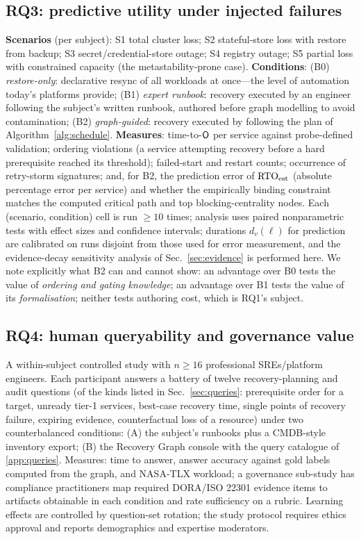 \subsection{RQ3: predictive utility under injected failures}
\label{sec:rq3}
\textbf{Scenarios} (per subject): S1 total cluster loss; S2 stateful-store loss with restore from backup; S3 secret/credential-store outage; S4 registry outage; S5 partial loss with constrained capacity (the metastability-prone case). \textbf{Conditions}: (B0) \emph{restore-only}: declarative resync of all workloads at once---the level of automation today's platforms provide; (B1) \emph{expert runbook}: recovery executed by an engineer following the subject's written runbook, authored before graph modelling to avoid contamination; (B2) \emph{graph-guided}: recovery executed by following the plan of Algorithm~\ref{alg:schedule}. \textbf{Measures}: time-to-$\mathsf{O}$ per service against probe-defined validation; ordering violations (a service attempting recovery before a hard prerequisite reached its threshold); failed-start and restart counts; occurrence of retry-storm signatures; and, for B2, the prediction error of $\mathrm{RTO}_{\mathrm{est}}$ (absolute percentage error per service) and whether the empirically binding constraint matches the computed critical path and top blocking-centrality nodes. Each (scenario, condition) cell is run $\geq 10$ times; analysis uses paired nonparametric tests with effect sizes and confidence intervals; durations $d_v(\ell)$ for prediction are calibrated on runs disjoint from those used for error measurement, and the evidence-decay sensitivity analysis of Sec.~\ref{sec:evidence} is performed here. We note explicitly what B2 can and cannot show: an advantage over B0 tests the value of \emph{ordering and gating knowledge}; an advantage over B1 tests the value of its \emph{formalisation}; neither tests authoring cost, which is RQ1's subject.

\subsection{RQ4: human queryability and governance value}
\label{sec:rq4}
A within-subject controlled study with $n \geq 16$ professional SREs/platform engineers. Each participant answers a battery of twelve recovery-planning and audit questions (of the kinds listed in Sec.~\ref{sec:queries}: prerequisite order for a target, unready tier-1 services, best-case recovery time, single points of recovery failure, expiring evidence, counterfactual loss of a resource) under two counterbalanced conditions: (A) the subject's runbooks plus a CMDB-style inventory export; (B) the Recovery Graph console with the query catalogue of \ref{app:queries}. Measures: time to answer, answer accuracy against gold labels computed from the graph, and NASA-TLX workload; a governance sub-study has compliance practitioners map required DORA/ISO 22301 evidence items to artifacts obtainable in each condition and rate sufficiency on a rubric. Learning effects are controlled by question-set rotation; the study protocol requires ethics approval and reports demographics and expertise moderators.

